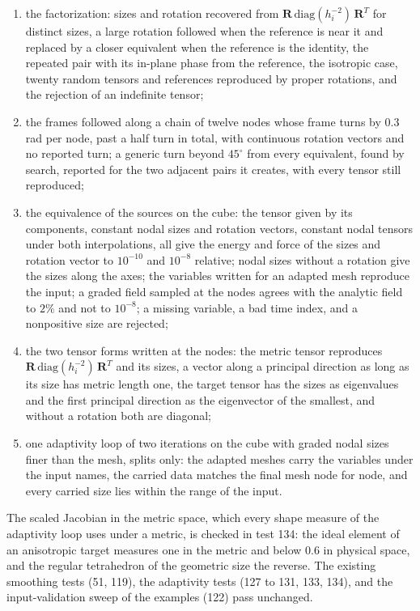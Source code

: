 \documentclass[11pt]{article}
\newcommand{\bs}[1]{\boldsymbol{#1}}
\begin{document}
\begin{enumerate}[itemsep=2pt]
\item the factorization: sizes and rotation recovered from
  $\bs R\,\mathrm{diag}(h_i^{-2})\,\bs R^T$ for distinct sizes, a large
  rotation followed when the reference is near it and replaced by a
  closer equivalent when the reference is the identity, the repeated pair
  with its in-plane phase from the reference, the isotropic case, twenty
  random tensors and references reproduced by proper rotations, and the
  rejection of an indefinite tensor;
\item the frames followed along a chain of twelve nodes whose frame turns
  by $0.3$ rad per node, past a half turn in total, with continuous
  rotation vectors and no reported turn; a generic turn beyond
  $45^\circ$ from every equivalent, found by search, reported for the two
  adjacent pairs it creates, with every tensor still reproduced;
\item the equivalence of the sources on the cube: the tensor given by its
  components, constant nodal sizes and rotation vectors, constant nodal
  tensors under both interpolations, all give the energy and force of the
  sizes and rotation vector to $10^{-10}$ and $10^{-8}$ relative; nodal
  sizes without a rotation give the sizes along the axes; the variables
  written for an adapted mesh reproduce the input; a graded field
  sampled at the nodes agrees with the analytic field to $2\%$ and not to
  $10^{-8}$; a missing variable, a bad time index, and a nonpositive size
  are rejected;
\item the two tensor forms written at the nodes: the metric tensor
  reproduces $\bs R\,\mathrm{diag}(h_i^{-2})\,\bs R^T$ and its sizes, a
  vector along a principal direction as long as its size has metric
  length one, the target tensor has the sizes as eigenvalues and the
  first principal direction as the eigenvector of the smallest, and
  without a rotation both are diagonal;
\item one adaptivity loop of two iterations on the cube with graded nodal
  sizes finer than the mesh, splits only: the adapted meshes carry the
  variables under the input names, the carried data matches the final
  mesh node for node, and every carried size lies within the range of the
  input.
\end{enumerate}
The scaled Jacobian in the metric space, which every shape measure of the
adaptivity loop uses under a metric, is checked in test 134: the ideal
element of an anisotropic target measures one in the metric and below
$0.6$ in physical space, and the regular tetrahedron of the geometric
size the reverse. The existing smoothing tests (51, 119),
the adaptivity tests (127 to 131, 133, 134), and the input-validation
sweep of the examples (122) pass unchanged.
\end{document}
